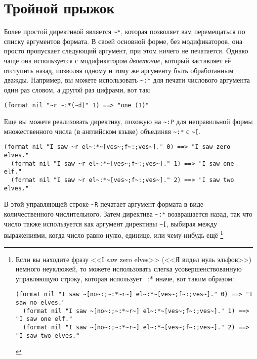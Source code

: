 \section{Тройной прыжок}

Более простой директивой является \lstinline!~*!, которая позволяет вам перемещаться по
списку аргументов формата. В своей основной форме, без модификаторов, она просто
пропускает следующий аргумент, при этом ничего не печатается. Однако чаще она используется
с модификатором \textit{двоеточие}, который заставляет её отступить назад, позволяя одному
и тому же аргументу быть обработанным дважды. Например, вы можете использовать
\lstinline!~:*! для печати числового аргумента один раз словом, а другой раз цифрами, вот
так:

\begin{lstlisting}[style=lisprepl]
  (format nil "~r ~:*(~d)" 1) ==> "one (1)"
\end{lstlisting}

Еще вы можете реализовать директиву, похожую на \lstinline!~:P! для неправильной формы множественного числа (в английском
языке) объединяя \lstinline!~:*! с \lstinline!~[!.

\begin{lstlisting}[style=lisprepl]
  (format nil "I saw ~r el~:*~[ves~;f~:;ves~]." 0) ==> "I saw zero elves."
  (format nil "I saw ~r el~:*~[ves~;f~:;ves~]." 1) ==> "I saw one elf."
  (format nil "I saw ~r el~:*~[ves~;f~:;ves~]." 2) ==> "I saw two elves."
\end{lstlisting}

В этой управляющей строке \lstinline!~R! печатает аргумент формата в виде количественного числительного. Затем директива
\lstinline!~:*! возвращается назад, так что число также используется как аргумент директивы \lstinline!~[!, выбирая между
выражениями, когда число равно нулю, единице, или чему-нибудь ещё \footnote{Если вы находите фразу <<I saw zero elves>>
(<<Я видел нуль эльфов>>) немного неуклюжей, то можете использовать слегка усовершенствованную управляющую строку,
которая использует ~:* иначе, вот таким образом:

\begin{lstlisting}[style=lisprepl]
  (format nil "I saw ~[no~:;~:*~r~] el~:*~[ves~;f~:;ves~]." 0) ==> "I saw no elves."
  (format nil "I saw ~[no~:;~:*~r~] el~:*~[ves~;f~:;ves~]." 1) ==> "I saw one elf."
  (format nil "I saw ~[no~:;~:*~r~] el~:*~[ves~;f~:;ves~]." 2) ==> "I saw two elves."
\end{lstlisting}

}

